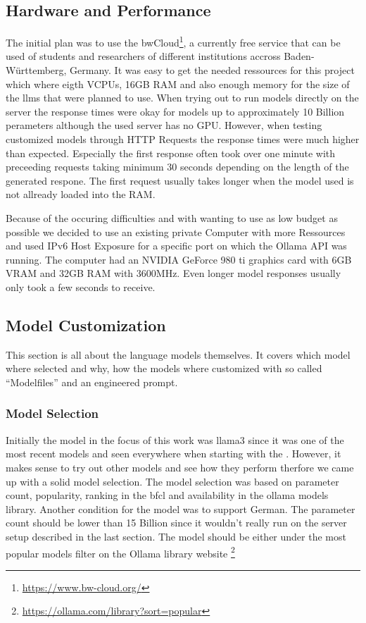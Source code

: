 \subsection{Hardware and Performance}
The initial plan was to use the bwCloud\footnote{\url{https://www.bw-cloud.org/}}, a currently free service that can be used of students and researchers of different institutions accross Baden-Württemberg, Germany.
It was easy to get the needed ressources for this project which where eigth VCPUs, 16GB RAM and also enough memory for the size of the \glspl{llm} that were planned to use.
When trying out to run models directly on the server the response times were okay for models up to approximately 10 Billion perameters although the used server has no GPU.
However, when testing customized models through HTTP Requests the response times were much higher than expected.
Especially the first response often took over one minute with preceeding requests taking minimum 30 seconds depending on the length of the generated respone.
The first request usually takes longer when the model used is not allready loaded into the RAM.

Because of the occuring difficulties and with wanting to use as low budget as possible we decided to use an existing private Computer with more Ressources and used IPv6 Host Exposure for a specific port on which the Ollama API was running.
The computer had an NVIDIA GeForce 980 ti graphics card with 6GB VRAM and 32GB RAM with 3600MHz.
Even longer model responses usually only took a few seconds to receive.

\subsection{Model Customization}
\label{subsec:modelcust}
This section is all about the language models themselves. It covers which model where selected and why, how the models where customized with so called ``Modelfiles'' and an engineered prompt.
\subsubsection{Model Selection}
Initially the model in the focus of this work was llama3 since it was one of the most recent models and seen everywhere when starting with the .
However, it makes sense to try out other models and see how they perform therfore we came up with a solid model selection.
The model selection was based on parameter count, popularity, ranking in the \gls{bfcl} and availability in the ollama models library.
Another condition for the model was to support German.
The parameter count should be lower than 15 Billion since it wouldn't really run on the server setup described in the last section.
The model should be either under the most popular models filter on the Ollama library website \footnote{\url{https://ollama.com/library?sort=popular}}

